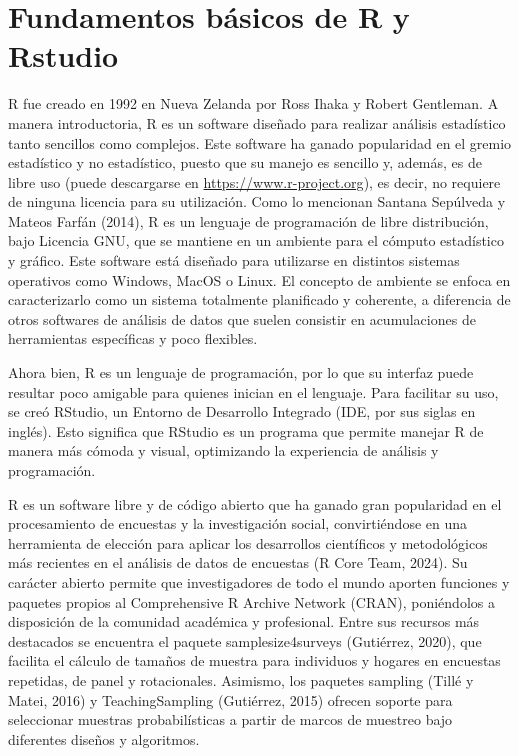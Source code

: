 \documentclass[
  12pt,
]{book}
\begin{document}
\section{Fundamentos básicos de R y Rstudio}\label{fundamentos-buxe1sicos-de-r-y-rstudio}

R fue creado en 1992 en Nueva Zelanda por Ross Ihaka y Robert Gentleman. A manera introductoria, R es un software diseñado para realizar análisis estadístico tanto sencillos como complejos. Este software ha ganado popularidad en el gremio estadístico y no estadístico, puesto que su manejo es sencillo y, además, es de libre uso (puede descargarse en \url{https://www.r-project.org}), es decir, no requiere de ninguna licencia para su utilización. Como lo mencionan Santana Sepúlveda y Mateos Farfán (2014), R es un lenguaje de programación de libre distribución, bajo Licencia GNU, que se mantiene en un ambiente para el cómputo estadístico y gráfico. Este software está diseñado para utilizarse en distintos sistemas operativos como Windows, MacOS o Linux. El concepto de ambiente se enfoca en caracterizarlo como un sistema totalmente planificado y coherente, a diferencia de otros softwares de análisis de datos que suelen consistir en acumulaciones de herramientas específicas y poco flexibles.

Ahora bien, R es un lenguaje de programación, por lo que su interfaz puede resultar poco amigable para quienes inician en el lenguaje. Para facilitar su uso, se creó RStudio, un Entorno de Desarrollo Integrado (IDE, por sus siglas en inglés). Esto significa que RStudio es un programa que permite manejar R de manera más cómoda y visual, optimizando la experiencia de análisis y programación.

R es un software libre y de código abierto que ha ganado gran popularidad en el procesamiento de encuestas y la investigación social, convirtiéndose en una herramienta de elección para aplicar los desarrollos científicos y metodológicos más recientes en el análisis de datos de encuestas (R Core Team, 2024). Su carácter abierto permite que investigadores de todo el mundo aporten funciones y paquetes propios al Comprehensive R Archive Network (CRAN), poniéndolos a disposición de la comunidad académica y profesional. Entre sus recursos más destacados se encuentra el paquete samplesize4surveys (Gutiérrez, 2020), que facilita el cálculo de tamaños de muestra para individuos y hogares en encuestas repetidas, de panel y rotacionales. Asimismo, los paquetes sampling (Tillé y Matei, 2016) y TeachingSampling (Gutiérrez, 2015) ofrecen soporte para seleccionar muestras probabilísticas a partir de marcos de muestreo bajo diferentes diseños y algoritmos.
\end{document}
